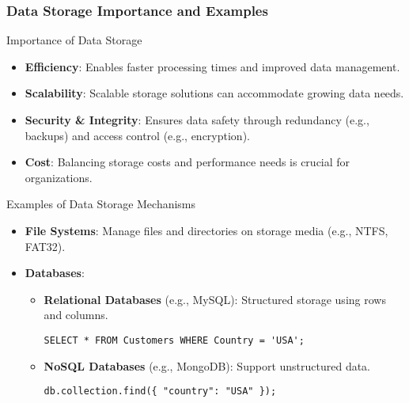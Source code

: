 \documentclass[aspectratio=169]{beamer}
\begin{document}
\begin{frame}[fragile]
    \frametitle{Data Storage Importance and Examples}
    \begin{block}{Importance of Data Storage}
        \begin{itemize}
            \item \textbf{Efficiency}: Enables faster processing times and improved data management.
            \item \textbf{Scalability}: Scalable storage solutions can accommodate growing data needs.
            \item \textbf{Security \& Integrity}: Ensures data safety through redundancy (e.g., backups) and access control (e.g., encryption).
            \item \textbf{Cost}: Balancing storage costs and performance needs is crucial for organizations.
        \end{itemize}
    \end{block}

    \begin{block}{Examples of Data Storage Mechanisms}
        \begin{itemize}
            \item \textbf{File Systems}: Manage files and directories on storage media (e.g., NTFS, FAT32).
            \item \textbf{Databases}:
            \begin{itemize}
                \item \textbf{Relational Databases} (e.g., MySQL): Structured storage using rows and columns.
                \begin{lstlisting}
SELECT * FROM Customers WHERE Country = 'USA';
                \end{lstlisting}
                \item \textbf{NoSQL Databases} (e.g., MongoDB): Support unstructured data.
                \begin{lstlisting}
db.collection.find({ "country": "USA" });
                \end{lstlisting}
            \end{itemize}
        \end{itemize}
    \end{block}
\end{frame}
\end{document}
